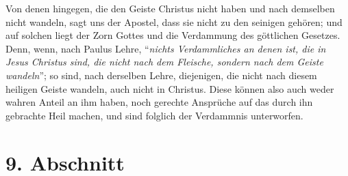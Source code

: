 Von denen hingegen, die den Geiste Christus nicht haben und nach demselben nicht
wandeln, sagt uns der Apostel, dass sie nicht zu den seinigen
gehören;
und auf solchen liegt der Zorn Gottes
und die Verdammung des göttlichen Gesetzes. 
Denn, wenn, nach Paulus Lehre, "`\textit{nichts Verdammliches an denen ist, die
in Jesus Christus sind, die nicht nach dem Fleische, sondern nach dem Geiste
wandeln}"';
so sind, nach derselben Lehre, diejenigen, die nicht nach diesem heiligen Geiste
wandeln, auch nicht in Christus.
Diese können also auch weder wahren Anteil an ihm haben, noch gerechte
Ansprüche auf das durch ihn gebrachte Heil machen, und sind folglich der
Verdammnis unterworfen. 

\section{9. Abschnitt} \label{kap1_ab9}

